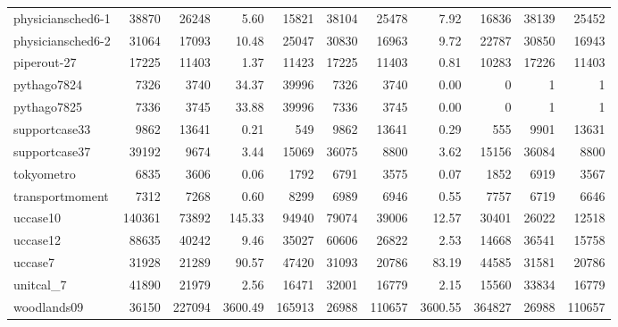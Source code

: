 \documentclass[pdflatex,sn-mathphys-num]{sn-jnl}%
\theoremstyle{thmstyleone}%
\theoremstyle{thmstylethree}%
\theoremstyle{thmstyletwo}%
\begin{document}
\begin{appendices}
{\begin{longtable}{l|r|r|r|r|r|r|r|r|r|r}
physiciansched6-1              & 38870 & 26248 & 5.60 & 15821 & 38104 & 25478 & 7.92 & 16836 & 38139 & 25452\\
physiciansched6-2              & 31064 & 17093 & 10.48 & 25047 & 30830 & 16963 & 9.72 & 22787 & 30850 & 16943\\
piperout-27                    & 17225 & 11403 & 1.37 & 11423 & 17225 & 11403 & 0.81 & 10283 & 17226 & 11403\\
pythago7824                    & 7326 & 3740 & 34.37 & 39996 & 7326 & 3740 & 0.00 & 0 & 1 & 1\\
pythago7825                    & 7336 & 3745 & 33.88 & 39996 & 7336 & 3745 & 0.00 & 0 & 1 & 1\\
supportcase33                  & 9862 & 13641 & 0.21 & 549 & 9862 & 13641 & 0.29 & 555 & 9901 & 13631\\
supportcase37                  & 39192 & 9674 & 3.44 & 15069 & 36075 & 8800 & 3.62 & 15156 & 36084 & 8800\\
tokyometro                     & 6835 & 3606 & 0.06 & 1792 & 6791 & 3575 & 0.07 & 1852 & 6919 & 3567\\
transportmoment                & 7312 & 7268 & 0.60 & 8299 & 6989 & 6946 & 0.55 & 7757 & 6719 & 6646\\
uccase10                       & 140361 & 73892 & 145.33 & 94940 & 79074 & 39006 & 12.57 & 30401 & 26022 & 12518\\
uccase12                       & 88635 & 40242 & 9.46 & 35027 & 60606 & 26822 & 2.53 & 14668 & 36541 & 15758\\
uccase7                        & 31928 & 21289 & 90.57 & 47420 & 31093 & 20786 & 83.19 & 44585 & 31581 & 20786\\
unitcal\_7                      & 41890 & 21979 & 2.56 & 16471 & 32001 & 16779 & 2.15 & 15560 & 33834 & 16779\\
woodlands09                    & 36150 & 227094 & 3600.49 & 165913 & 26988 & 110657 & 3600.55 & 364827 & 26988 & 110657
\end{longtable}
}
\end{appendices}
\end{document}
